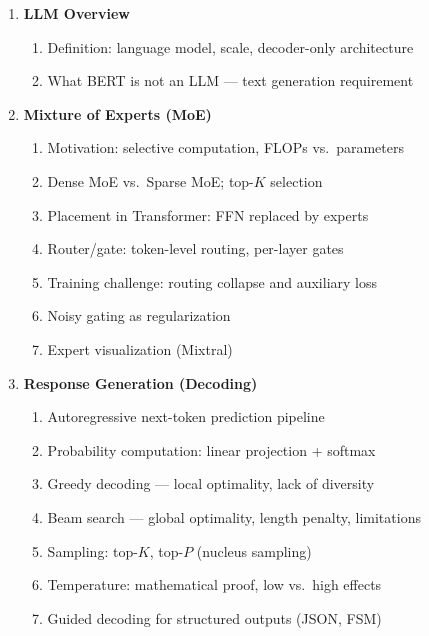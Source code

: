 \documentclass[11pt, a4paper]{article}
\begin{document}
\begin{enumerate}[label=\textbf{\arabic*.}, leftmargin=2em]
  \item \textbf{LLM Overview}
    \begin{enumerate}[label=\arabic{enumi}.\arabic*]
      \item Definition: language model, scale, decoder-only architecture
      \item What BERT is not an LLM --- text generation requirement
    \end{enumerate}

  \item \textbf{Mixture of Experts (MoE)}
    \begin{enumerate}[label=\arabic{enumi}.\arabic*]
      \item Motivation: selective computation, FLOPs vs.\ parameters
      \item Dense MoE vs.\ Sparse MoE; top-$K$ selection
      \item Placement in Transformer: FFN replaced by experts
      \item Router/gate: token-level routing, per-layer gates
      \item Training challenge: routing collapse and auxiliary loss
      \item Noisy gating as regularization
      \item Expert visualization (Mixtral)
    \end{enumerate}

  \item \textbf{Response Generation (Decoding)}
    \begin{enumerate}[label=\arabic{enumi}.\arabic*]
      \item Autoregressive next-token prediction pipeline
      \item Probability computation: linear projection + softmax
      \item Greedy decoding --- local optimality, lack of diversity
      \item Beam search --- global optimality, length penalty, limitations
      \item Sampling: top-$K$, top-$P$ (nucleus sampling)
      \item Temperature: mathematical proof, low vs.\ high effects
      \item Guided decoding for structured outputs (JSON, FSM)
    \end{enumerate}


\end{enumerate}
\end{document}

